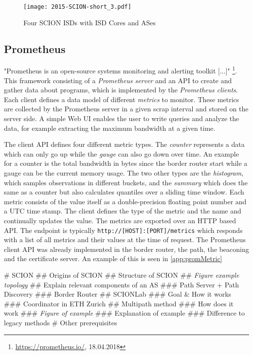 \documentclass[thesis.tex]{subfiles}
\begin{document}
\begin{figure}
	\centering
	\texttt{[image: 2015-SCION-short\_3.pdf]}
	\caption{Four SCION ISDs with ISD Cores and ASes \cite{SCIONPaper}}
	\label{fig:prequirement:scionStructure}
\end{figure}

\subsection{Prometheus} 

"Prometheus is an open-source systems monitoring and alerting toolkit [...]" \footnote{\url{https://prometheus.io/}, 18.04.2018}. This framework consisting of a \textit{Prometheus server} and an API to create and gather data about programs, which is implemented by the \textit{Prometheus clients}. Each client defines a data model of different \textit{metrics} to monitor. These metrics are collected by the Prometheus server in a given scrap interval and stored on the server side. A simple Web UI enables the user to write queries and analyze the data, for example extracting the maximum bandwidth at a given time.

The client API defines four different metric types. The \textit{counter} represents a data which can only go up while the \textit{gauge} can also go down over time. An example for a counter is the total bandwidth in bytes since the border router start while a gauge can be the current memory usage. The two other types are the \textit{histogram}, which samples observations in different buckets, and the \textit{summary} which does the same as a counter but also calculates quantiles over a sliding time window. Each metric consists of the value itself as a double-precision floating point number and a UTC time stamp. The client defines the type of the metric and the name and continually updates the value. The metrics are exported over an HTTP based API. The endpoint is typically {\lstinline|http://[HOST]:[PORT]/metrics|} which responds with a list of all metrics and their values at the time of request. The Prometheus client API was already implemented in the border router, the path, the beaconing and the certificate server. An example of this is seen in \autoref{app:promMetric}

\begin{easylist}
    \MyListProperties
    # SCION
    ## Origins of SCION
    ## Structure of SCION
    ## \textit{Figure example topology}
    ## Explain relevant components of an AS
    ### Path Server + Path Discovery
    ### Border Router
    ## SCIONLab
    ### Goal \& How it works
    ### Coordinator in ETH Zurich
    ## Multipath method
    ### How does it work
    ### \textit{Figure of example}
    ### Explanation of example
    ### Difference to legacy methods
    # Other prerequisites
\end{easylist}
\end{document}
